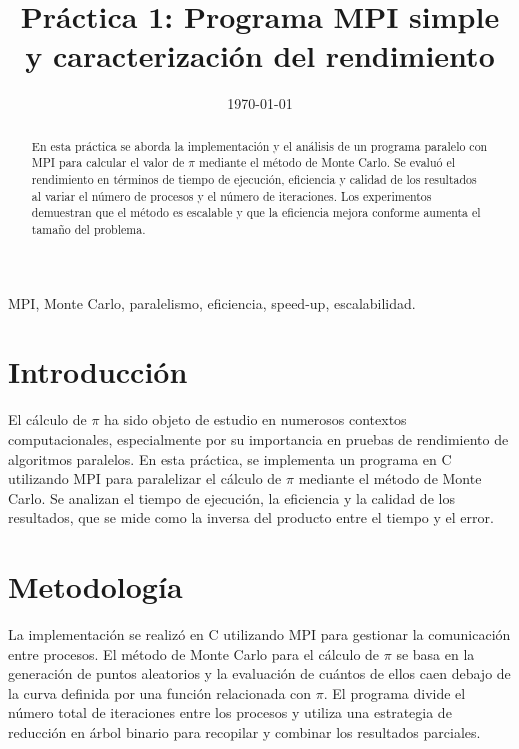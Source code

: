 \documentclass[conference, a4paper]{IEEEtran}
\begin{document}
\title{Práctica 1: Programa MPI simple y caracterización del rendimiento}
\author{
}
\date{\today}

\maketitle

\begin{abstract}
En esta práctica se aborda la implementación y el análisis de un programa paralelo con MPI para calcular el valor de \(\pi\) mediante el método de Monte Carlo. Se evaluó el rendimiento en términos de tiempo de ejecución, eficiencia y calidad de los resultados al variar el número de procesos y el número de iteraciones. Los experimentos demuestran que el método es escalable y que la eficiencia mejora conforme aumenta el tamaño del problema.
\end{abstract}

\begin{IEEEkeywords}
MPI, Monte Carlo, paralelismo, eficiencia, speed-up, escalabilidad.
\end{IEEEkeywords}

\section{Introducción}
El cálculo de \(\pi\) ha sido objeto de estudio en numerosos contextos computacionales, especialmente por su importancia en pruebas de rendimiento de algoritmos paralelos. En esta práctica, se implementa un programa en C utilizando MPI para paralelizar el cálculo de \(\pi\) mediante el método de Monte Carlo. Se analizan el tiempo de ejecución, la eficiencia y la calidad de los resultados, que se mide como la inversa del producto entre el tiempo y el error.

\section{Metodología}
La implementación se realizó en C utilizando MPI para gestionar la comunicación entre procesos. El método de Monte Carlo para el cálculo de \(\pi\) se basa en la generación de puntos aleatorios y la evaluación de cuántos de ellos caen debajo de la curva definida por una función relacionada con \(\pi\). El programa divide el número total de iteraciones entre los procesos y utiliza una estrategia de reducción en árbol binario para recopilar y combinar los resultados parciales.
\end{document}
